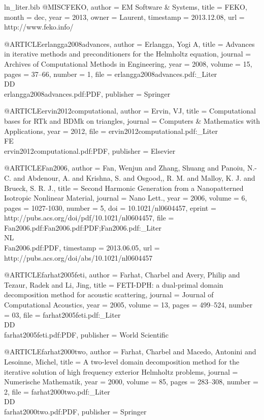 \begin{filecontents*}{ln_liter.bib}
@MISC{FEKO,
  author = {{EM Software \& Systems}},
  title = {{FEKO}},
  month = dec,
  year = {2013},
  owner = {Laurent},
  timestamp = {2013.12.08},
  url = {http://www.feko.info/}
}

@ARTICLE{erlangga2008advances,
  author = {Erlangga, Yogi A},
  title = {Advances in iterative methods and preconditioners for the {{Helmholtz}}
	equation},
  journal = {Archives of Computational Methods in Engineering},
  year = {2008},
  volume = {15},
  pages = {37--66},
  number = {1},
  file = {erlangga2008advances.pdf:_Liter\\DD\\erlangga2008advances.pdf:PDF},
  publisher = {Springer}
}

@ARTICLE{ervin2012computational,
  author = {Ervin, VJ},
  title = {Computational bases for RTk and BDMk on triangles},
  journal = {Computers \& Mathematics with Applications},
  year = {2012},
  file = {ervin2012computational.pdf:_Liter\\FE\\ervin2012computational.pdf:PDF},
  publisher = {Elsevier}
}

@ARTICLE{Fan2006,
  author = {Fan, Wenjun and Zhang, Shuang and Panoiu, N.-C. and Abdenour, A.
	and Krishna, S. and Osgood,, R. M. and Malloy, K. J. and Brueck,
	S. R. J.},
  title = {Second Harmonic Generation from a Nanopatterned Isotropic Nonlinear
	Material},
  journal = {Nano Lett.},
  year = {2006},
  volume = {6},
  pages = {1027-1030},
  number = {5},
  doi = {10.1021/nl0604457},
  eprint = {http://pubs.acs.org/doi/pdf/10.1021/nl0604457},
  file = {Fan2006.pdf:Fan2006.pdf:PDF;Fan2006.pdf:_Liter\\NL\\Fan2006.pdf:PDF},
  timestamp = {2013.06.05},
  url = {http://pubs.acs.org/doi/abs/10.1021/nl0604457}
}

@ARTICLE{farhat2005feti,
  author = {Farhat, Charbel and Avery, Philip and Tezaur, Radek and Li, Jing},
  title = {FETI-DPH: a dual-primal domain decomposition method for acoustic
	scattering},
  journal = {Journal of Computational Acoustics},
  year = {2005},
  volume = {13},
  pages = {499--524},
  number = {03},
  file = {farhat2005feti.pdf:_Liter\\DD\\farhat2005feti.pdf:PDF},
  publisher = {World Scientific}
}

@ARTICLE{farhat2000two,
  author = {Farhat, Charbel and Macedo, Antonini and Lesoinne, Michel},
  title = {A two-level domain decomposition method for the iterative solution
	of high frequency exterior {Helmholtz} problems},
  journal = {Numerische Mathematik},
  year = {2000},
  volume = {85},
  pages = {283--308},
  number = {2},
  file = {farhat2000two.pdf:_Liter\\DD\\farhat2000two.pdf:PDF},
  publisher = {Springer}
}


\end{filecontents*}
